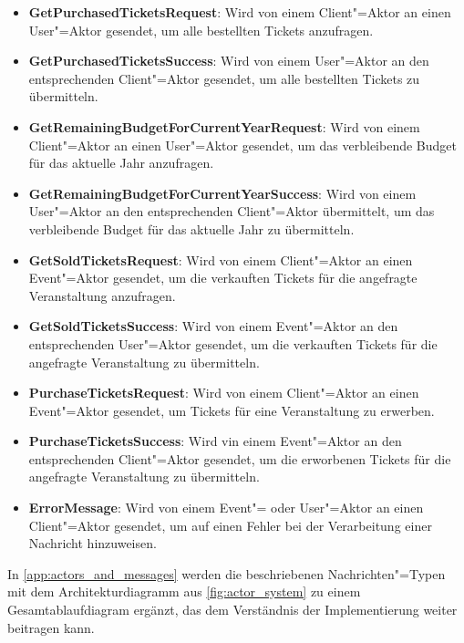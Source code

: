 \begin{itemize}[itemsep=-.5em,leftmargin=*]
    \item \textbf{GetPurchasedTicketsRequest}: Wird von einem Client"=Aktor an einen User"=Aktor gesendet, um alle bestellten Tickets anzufragen.
    \item \textbf{GetPurchasedTicketsSuccess}: Wird von einem User"=Aktor an den entsprechenden Client"=Aktor gesendet, um alle bestellten Tickets zu übermitteln.
    \item \textbf{GetRemainingBudgetForCurrentYearRequest}: Wird von einem Client"=Aktor an einen User"=Aktor gesendet, um das verbleibende Budget für das aktuelle Jahr anzufragen.
    \item \textbf{GetRemainingBudgetForCurrentYearSuccess}: Wird von einem User"=Aktor an den entsprechenden Client"=Aktor übermittelt, um das verbleibende Budget für das aktuelle Jahr zu übermitteln.
    \item \textbf{GetSoldTicketsRequest}: Wird von einem Client"=Aktor an einen Event"=Aktor gesendet, um die verkauften Tickets für die angefragte Veranstaltung anzufragen.
    \item \textbf{GetSoldTicketsSuccess}: Wird von einem Event"=Aktor an den entsprechenden User"=Aktor gesendet, um die verkauften Tickets für die angefragte Veranstaltung zu übermitteln.
    \item \textbf{PurchaseTicketsRequest}: Wird von einem Client"=Aktor an einen Event"=Aktor gesendet, um Tickets für eine Veranstaltung zu erwerben.
    \item \textbf{PurchaseTicketsSuccess}: Wird vin einem Event"=Aktor an den entsprechenden Client"=Aktor gesendet, um die erworbenen Tickets für die angefragte Veranstaltung zu übermitteln.
    \item \textbf{ErrorMessage}: Wird von einem Event"= oder User"=Aktor an einen Client"=Aktor gesendet, um auf einen Fehler bei der Verarbeitung einer Nachricht hinzuweisen.
\end{itemize}

In \autoref{app:actors_and_messages} werden die beschriebenen Nachrichten"=Typen mit dem Architekturdiagramm aus \autoref{fig:actor_system} zu einem Gesamtablaufdiagram ergänzt, das dem Verständnis der Implementierung weiter beitragen kann.
